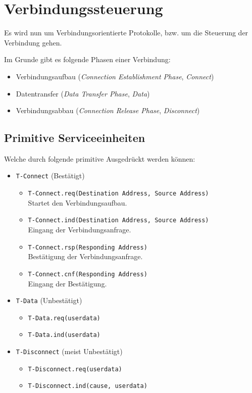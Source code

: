     \section{Verbindungssteuerung}
        Es wird nun um Verbindungsorientierte Protokolle, bzw. um die Steuerung der Verbindung gehen.
        
        Im Grunde gibt es folgende Phasen einer Verbindung:
        \begin{itemize}
        	\item Verbindungsaufbau (\textit{Connection Establishment Phase}, \textit{Connect})
        	\item Datentransfer (\textit{Data Transfer Phase}, \textit{Data})
        	\item Verbindungsabbau (\textit{Connection Release Phase}, \textit{Disconnect})
        \end{itemize}
        
        \subsection{Primitive Serviceeinheiten}
            Welche durch folgende primitive Ausgedrückt werden können:
            \begin{itemize}
            	\item \texttt{T-Connect} (Bestätigt)
	            	\begin{itemize}
	            		\item \texttt{T-Connect.req(Destination Address, Source Address)} \\ Startet den Verbindungsaufbau.
	            		\item \texttt{T-Connect.ind(Destination Address, Source Address)} \\ Eingang der Verbindungsanfrage.
	            		\item \texttt{T-Connect.rsp(Responding Address)} \\ Bestätigung der Verbindungsanfrage.
	            		\item \texttt{T-Connect.cnf(Responding Address)} \\ Eingang der Bestätigung.
	            	\end{itemize}
	            \item \texttt{T-Data} (Unbestätigt)
		            \begin{itemize}
		            	\item \texttt{T-Data.req(userdata)}
		            	\item \texttt{T-Data.ind(userdata)}
		            \end{itemize}
	            \item \texttt{T-Disconnect} (meist Unbestätigt)
		            \begin{itemize}
		            	\item \texttt{T-Disconnect.req(userdata)}
		            	\item \texttt{T-Disconnect.ind(cause, userdata)}
		            \end{itemize}
            \end{itemize}
            
